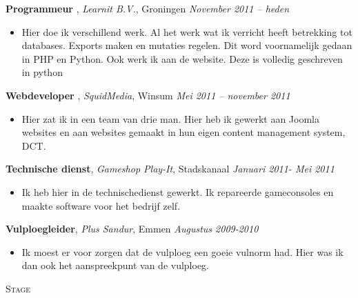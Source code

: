 \documentclass[9pt]{article}
\newenvironment{changemargin}[2]{%
  \begin{list}{}{%
    \setlength{\topsep}{0pt}%
    \setlength{\leftmargin}{#1}%
    \setlength{\rightmargin}{#2}%
    \setlength{\listparindent}{\parindent}%
    \setlength{\itemindent}{\parindent}%
    \setlength{\parsep}{\parskip}%
  }%
  \item[]}{\end{list}
}
\newcommand{\lineover}{
	\begin{changemargin}{-0.05in}{-0.05in}
		\vspace*{-8pt}
		\hrulefill \\
		\vspace*{-2pt}
	\end{changemargin}
}
\newcommand{\header}[1]{
	\begin{changemargin}{-0.5in}{-0.5in}
		\scshape{#1}\\
  	\lineover
	\end{changemargin}
}
\newenvironment{body} {
	\vspace*{-16pt}
	\begin{changemargin}{-0.25in}{-0.5in}
  }	
	{\end{changemargin}
}
\begin{document}
\begin{body}
	\vspace{14pt}
	\textbf{Programmeur }, \emph{Learnit B.V.}, Groningen \hfill \emph{November 2011 -- heden}\\
	\vspace*{-4pt}
	\begin{itemize} \itemsep -0pt  %
		\item Hier doe ik verschillend werk. Al het werk wat ik verricht heeft betrekking tot databases. Exports maken en mutaties regelen. Dit word voornamelijk gedaan in PHP en Python. Ook werk ik aan de website. Deze is volledig geschreven in python 
	\end{itemize}

	\textbf {Webdeveloper }, \emph{SquidMedia}, Winsum  \hfill \emph{Mei 2011 -- november 2011 }\\
	\vspace*{-4pt}
	\begin{itemize} \itemsep -0pt
		\item Hier zat ik in een team van drie man. Hier heb ik gewerkt aan Joomla websites en aan websites gemaakt in hun eigen content management system, DCT.
	\end{itemize}

	\textbf {Technische dienst}, \emph{Gameshop Play-It}, Stadskanaal   \hfill \emph{Januari 2011- Mei 2011  }\\
	\vspace*{-4pt}
	\begin{itemize} \itemsep -0pt
		\item Ik heb hier in de technischedienst gewerkt. Ik repareerde gameconsoles en maakte software voor het bedrijf zelf.
	\end{itemize}

	\textbf {Vulploegleider}, \emph{Plus Sandur}, Emmen  \hfill \emph{Augustus 2009-2010}\\
	\vspace*{-4pt}
	\begin{itemize} \itemsep -0pt
		\item Ik moest er voor zorgen dat de vulploeg een goeie vulnorm had. Hier was ik dan ook het aanspreekpunt van de vulploeg.
	\end{itemize}
\end{body}

\smallskip

\newpage{} %

\header{Stage}
\end{document}
